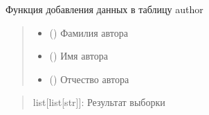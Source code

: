 \documentclass[letterpaper,10pt,russian]{sphinxmanual}
\begin{document}
\begin{fulllineitems}
\begin{fulllineitems}
\label{\detokenize{database.sqlite3_interface.tables:database.sqlite3_interface.tables.author.Author.insert_get_data}}
\pysigstartsignatures
{}
\pysigstopsignatures
\sphinxAtStartPar
Функция добавления данных в таблицу author
\begin{quote}\begin{description}
\begin{itemize}
\item {} 
\sphinxAtStartPar
{} () \textendash{} Фамилия автора

\item {} 
\sphinxAtStartPar
{} () \textendash{} Имя автора

\item {} 
\sphinxAtStartPar
{} () \textendash{} Отчество автора

\end{itemize}

\end{description}\end{quote}
\begin{description}
\begin{sphinxVerbatim}[commandchars=\\\{\}]
\end{sphinxVerbatim}

\end{description}
\begin{quote}\begin{description}
\sphinxAtStartPar
list{[}list{[}str{]}{]}: Результат выборки


\end{description}
\end{quote}
\end{fulllineitems}
\end{fulllineitems}
\end{document}
